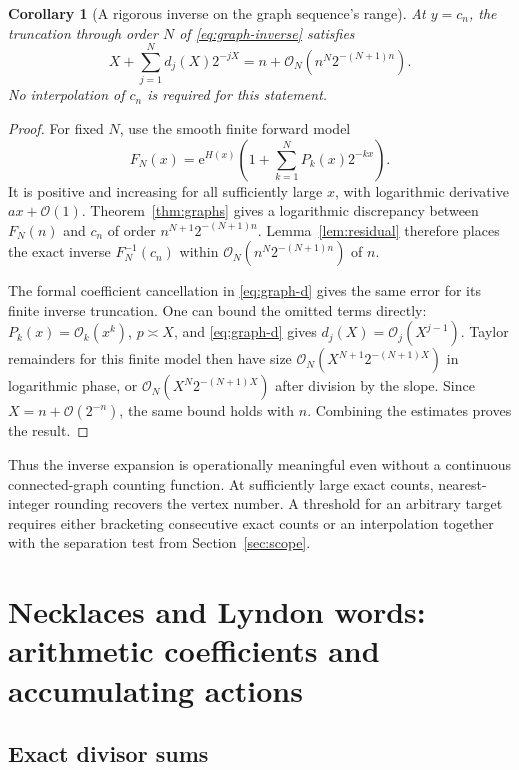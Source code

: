 \documentclass[11pt,a4paper]{article}
\numberwithin{equation}{section}
\newtheorem{corollary}[theorem]{Corollary}
\theoremstyle{definition}
\theoremstyle{remark}
\newcommand{\ee}{\mathrm e}
\newcommand{\bigO}{\mathcal O}
\begin{document}
\begin{corollary}[A rigorous inverse on the graph sequence's range]
\label{cor:graph-range}
At $y=c_n$, the truncation through order $N$ of \eqref{eq:graph-inverse} satisfies
\begin{equation}
 X+\sum_{j=1}^Nd_j(X)2^{-jX}
 =n+\bigO_N\!\left(n^N2^{-(N+1)n}\right).
 \label{eq:graph-range-error}
\end{equation}
No interpolation of $c_n$ is required for this statement.
\end{corollary}
\begin{proof}
For fixed $N$, use the smooth finite forward model
\[
 F_N(x)=\ee^{H(x)}\left(1+\sum_{k=1}^NP_k(x)2^{-kx}\right).
\]
It is positive and increasing for all sufficiently large $x$, with logarithmic derivative $ax+\bigO(1)$. Theorem~\ref{thm:graphs} gives a logarithmic discrepancy between $F_N(n)$ and $c_n$ of order $n^{N+1}2^{-(N+1)n}$. Lemma~\ref{lem:residual} therefore places the exact inverse $F_N^{-1}(c_n)$ within $\bigO_N(n^N2^{-(N+1)n})$ of $n$.

The formal coefficient cancellation in \eqref{eq:graph-d} gives the same error for its finite inverse truncation. One can bound the omitted terms directly: $P_k(x)=\bigO_k(x^k)$, $p\asymp X$, and \eqref{eq:graph-d} gives $d_j(X)=\bigO_j(X^{j-1})$. Taylor remainders for this finite model then have size $\bigO_N(X^{N+1}2^{-(N+1)X})$ in logarithmic phase, or $\bigO_N(X^N2^{-(N+1)X})$ after division by the slope. Since $X=n+\bigO(2^{-n})$, the same bound holds with $n$. Combining the estimates proves the result.
\end{proof}

Thus the inverse expansion is operationally meaningful even without a continuous connected-graph counting function. At sufficiently large exact counts, nearest-integer rounding recovers the vertex number. A threshold for an arbitrary target requires either bracketing consecutive exact counts or an interpolation together with the separation test from Section~\ref{sec:scope}.

\section{Necklaces and Lyndon words: arithmetic coefficients and accumulating actions}
\label{sec:necklaces}

\subsection{Exact divisor sums}
\end{document}
